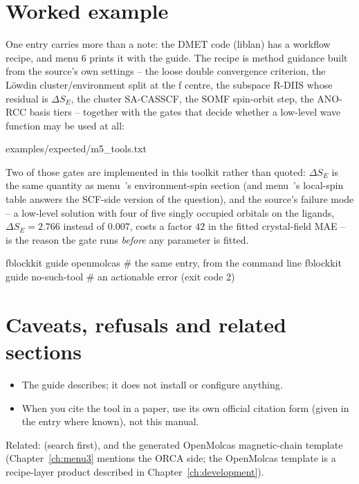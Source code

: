\section{Worked example}

One entry carries more than a note: the DMET code (liblan) has a workflow
recipe, and menu 6 prints it with the guide.  The recipe is method guidance
built from the source's own settings -- the loose double convergence criterion,
the L\"owdin cluster/environment split at the f centre, the subspace R-DIIS
whose residual is $\Delta S_E$, the cluster SA-CASSCF, the SOMF spin-orbit
step, the ANO-RCC basis tiers -- together with the gates that decide whether
a low-level wave function may be used at all:


  {examples/expected/m5_tools.txt}

Two of those gates are implemented in this toolkit rather than quoted:
$\Delta S_E$ is the same quantity as menu~'s environment-spin section
(and menu~'s local-spin table answers the SCF-side version of the
question), and the source's failure mode -- a low-level solution with four of
five singly occupied orbitals on the ligands, $\Delta S_E = 2.766$ instead of
$0.007$, costs a factor $42$ in the fitted crystal-field MAE -- is the reason
the gate runs \emph{before} any parameter is fitted.

\begin{codeblock}
fblockkit guide openmolcas     # the same entry, from the command line
fblockkit guide no-such-tool   # an actionable error (exit code 2)
\end{codeblock}

\section{Caveats, refusals and related sections}

\begin{refusalbox}
\begin{itemize}
  \item The guide describes; it does not install or configure anything.
  \item When you cite the tool in a paper, use its own official citation form
    (given in the entry where known), not this manual.
\end{itemize}
\end{refusalbox}

Related:  (search first), and the generated OpenMolcas magnetic-chain
template (Chapter~\ref{ch:menu3} mentions the ORCA side; the OpenMolcas
template is a recipe-layer product described in Chapter~\ref{ch:development}).
